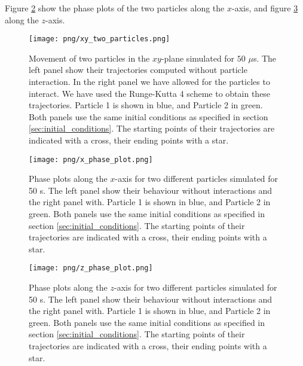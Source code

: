 Figure \ref{fig:x_phase_two_particles} show the phase plots of the two particles along the $x$-axis, and figure \ref{fig:z_phase_two_particles} along the $z$-axis.
\newpage
\onecolumngrid


\begin{figure}
    \texttt{[image: png/xy\_two\_particles.png]}
    \caption{Movement of two particles in the $xy$-plane simulated for $50$ $\mu$s. The left panel show their trajectories computed without particle interaction. In the right panel we have allowed for the particles to interact. We have used the Runge-Kutta 4 scheme to obtain these trajectories. Particle 1 is shown in blue, and Particle 2 in green. Both panels use the same initial conditions as specified in section \ref{sec:initial_conditions}. The starting points of their trajectories are indicated with a cross, their ending points with a star. }
    \label{fig:xy_two_particles}
\end{figure}

\begin{figure}
    \texttt{[image: png/x\_phase\_plot.png]}
    \caption{Phase plots along the $x$-axis for two different particles simulated for 50 \textmu s. The left panel show their behaviour without interactions and the right panel with. Particle 1 is shown in blue, and Particle 2 in green. Both panels use the same initial conditions as specified in section \ref{sec:initial_conditions}. The starting points of their trajectories are indicated with a cross, their ending points with a star.}
    \label{fig:x_phase_two_particles}
\end{figure} 

\begin{figure}
    \texttt{[image: png/z\_phase\_plot.png]}
    \caption{Phase plots along the $z$-axis for two different particles simulated for 50 \textmu s. The left panel show their behaviour without interactions and the right panel with. Particle 1 is shown in blue, and Particle 2 in green. Both panels use the same initial conditions as specified in section \ref{sec:initial_conditions}. The starting points of their trajectories are indicated with a cross, their ending points with a star.}
    \label{fig:z_phase_two_particles}
\end{figure}


